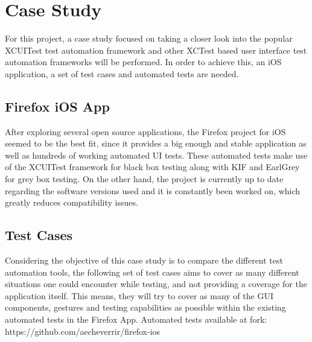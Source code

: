 \chapter{Case Study}
\label{chapter3}
For this project, a case study focused on taking a closer look into the popular XCUITest test automation framework and other XCTest based user interface test automation frameworks will be performed. In order to achieve this, an iOS application, a set of test cases and automated tests are needed.


\section{Firefox iOS App}
After exploring several open source applications, the Firefox project for iOS seemed to be the best fit, since it provides a big enough and stable application as well as hundreds of working automated UI tests. These automated tests make use of the XCUITest framework for black box testing along with KIF and EarlGrey for grey box testing. On the other hand, the project is currently up to date regarding the software versions used and it is constantly been worked on, which greatly reduces compatibility issues. \cite{FirefoxAppiOS}

\section{Test Cases}
Considering the objective of this case study is to compare the different test automation tools, the following set of test cases aims to cover as many different situations one could encounter while testing, and not providing a coverage for the application itself. This means, they will try to cover as many of the GUI components, gestures and testing capabilities as possible within the existing automated tests in the Firefox App. Automated tests available at fork: https://github.com/aecheverrir/firefox-ios

